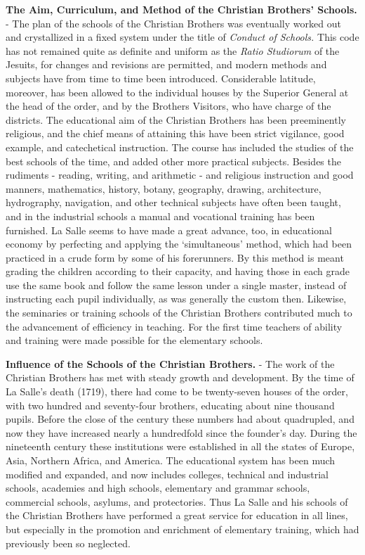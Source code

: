 \documentclass[]{book}
\begin{document}
\textbf{The Aim, Curriculum, and Method of the Christian Brothers' Schools.} - The plan of the schools of the Christian Brothers was eventually worked out and crystallized in a fixed system under the title of \emph{Conduct of Schools.} This code has not remained quite as definite and uniform as the \emph{Ratio Studiorum} of the Jesuits, for changes and revisions are permitted, and modern methods and subjects have from time to time been introduced. Considerable latitude, moreover, has been allowed to the individual houses by the Superior General at the head of the order, and by the Brothers Visitors, who have charge of the districts. The educational aim of the Christian Brothers has been preeminently religious, and the chief means of attaining this have been strict vigilance, good example, and catechetical instruction. The course has included the studies of the best schools of the time, and added other more practical subjects. Besides the rudiments - reading, writing, and arithmetic - and religious instruction and good manners, mathematics, history, botany, geography, drawing, architecture, hydrography, navigation, and other technical subjects have often been taught, and in the industrial schools a manual and vocational training has been furnished. La Salle seems to have made a great advance, too, in educational economy by perfecting and applying the `simultaneous' method, which had been practiced in a crude form by some of his forerunners. By this method is meant grading the children according to their capacity, and having those in each grade use the same book and follow the same lesson under a single master, instead of instructing each pupil individually, as was generally the custom then. Likewise, the seminaries or training schools of the Christian Brothers contributed much to the advancement of efficiency in teaching. For the first time teachers of ability and training were made possible for the elementary schools.

\textbf{Influence of the Schools of the Christian Brothers.} - The work of the Christian Brothers has met with steady growth and development. By the time of La Salle's death (1719), there had come to be twenty-seven houses of the order, with two hundred and seventy-four brothers, educating about nine thousand pupils. Before the close of the century these numbers had about quadrupled, and now they have increased nearly a hundredfold since the founder's day. During the nineteenth century these institutions were established in all the states of Europe, Asia, Northern Africa, and America. The educational system has been much modified and expanded, and now includes colleges, technical and industrial schools, academies and high schools, elementary and grammar schools, commercial schools, asylums, and protectories. Thus La Salle and his schools of the Christian Brothers have performed a great service for education in all lines, but especially in the promotion and enrichment of elementary training, which had previously been so neglected.
\end{document}
